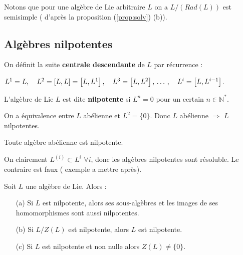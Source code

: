 \documentclass[a4paper,openany,12pt]{report}
\newcommand{\NN}{\mathbb{N}}
\theoremstyle{break}
{\theorembodyfont{\upshape}
\newtheorem*{rmq}{Remarque :}
\newtheorem*{prv}{Preuve :}
\newtheorem*{ex}{Exemples :}
\newtheorem*{exe}{Exemple : }
\newtheorem*{nota}{Notation :}
\newtheorem*{dem}{D\'emonstration :}}
\begin{document}
Notons que pour une algèbre de Lie arbitraire $L$ on a $L/(Rad (L))$ est semisimple ( d'après la proposition (\ref{prop:solv}) (b)).

\subsection{Algèbres nilpotentes}

On définit la suite \textbf{centrale descendante} de $L$ par récurrence :
\begin{center}
$L^{1}=L, \quad L^{2}=[L, L]=\left[L, L^{1}\right], \quad L^{3}=\left[L, L^{2}\right], \thinspace \ldots \thinspace, \quad L^{i}=\left[L, L^{i-1}\right]$.
\end{center}

\begin{df}
\quad L'algèbre de Lie $L$ est dite \textbf{nilpotente} si $L^{n}=0$ pour un certain $n \in \NN^{*}$.
\end{df}

\begin{rmq}
\quad On a équivalence entre $L$ abélienne et $L^{2}= \{ 0 \}$. Donc $L$ abélienne $\Rightarrow$ $L$ nilpotentes.
\end{rmq}

\begin{exe}
\quad Toute algèbre abélienne est nilpotente.

On clairement $L^{(i)}\subset L^{i}$ $\forall i$, donc les algèbres nilpotentes sont résoluble.
Le contraire est faux ( exemple a mettre après).
\end{exe}

\begin{prop}\label{prop:nilp}
\quad Soit $L$ une algèbre de Lie. Alors :
\begin{itemize}
\item[(a)] Si $L$ est nilpotente, alors ses sous-algèbres et les images de ses homomorphismes sont aussi nilpotentes.

\item[(b)]  Si $L/Z(L)$ est nilpotente, alors $L$ est nilpotente.

\item[(c)] Si $L$ est nilpotente et non nulle alors $Z(L) \ne \{0\}$.
\end{itemize}
\end{prop}
\end{document}
